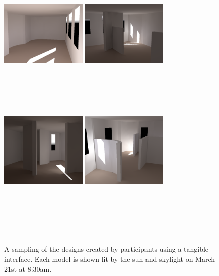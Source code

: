 \begin{figure}[t]
\includegraphics[width=1.62in]{../uist2012/images/creativity/C_A6_2026obj_march_CROPPED.png}
\includegraphics[width=1.62in]{../uist2012/images/creativity/C_A2_FIXED_2020obj_march_CROPPED.png}\vspace{-0.2in}\\
\begin{minipage}{1.62in}~{\color{white}{\bf A6}}\end{minipage} 
\begin{minipage}{1.62in}~{\color{white}{\bf A2}}\end{minipage}\vspace{0.05in}\\
\includegraphics[width=1.62in]{../uist2012/images/creativity/C_N2_1994obj_march_CROPPED.png}
\includegraphics[width=1.62in]{../uist2012/images/creativity/C_N4_FIXED_2090obj_march_CROPPED.png}\vspace{-0.2in}\\
\begin{minipage}{1.62in}~{\color{white}{\bf N2}}\end{minipage} 
\begin{minipage}{1.62in}~{\color{white}{\bf N4}}\end{minipage}\vspace{-0.15in}\\
\caption{A sampling of the designs created by participants using a
  tangible interface.  Each model is shown lit by the sun and skylight on
  March 21st at 8:30am.
%
}
\label{figure:creativity_rendering}
\vspace{-0.1in}
\end{figure}

